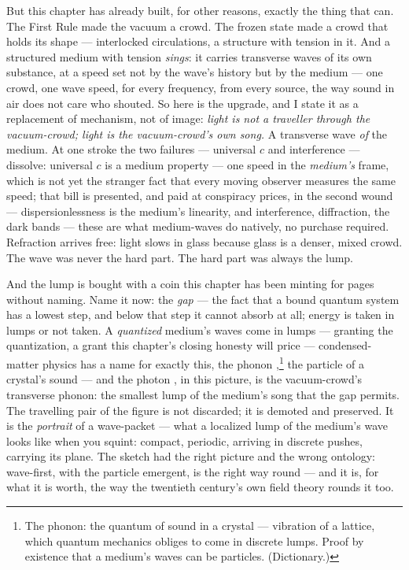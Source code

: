 \documentclass[fontsize=11pt,paper=a4,pagesize=auto,parskip=half-]{scrbook}
\newcommand{\Ixtmp}{}
\DeclareRobustCommand{\Ix}[1]{%
  #1%
  \begingroup
    \lowercase{\gdef\Ixtmp{#1}}%
    \expandafter\index\expandafter{\Ixtmp}%
  \endgroup}
\begin{document}
But this chapter has already built, for other reasons, exactly the thing that can. The First Rule made the vacuum a crowd. The \Ix{frozen state} made a crowd that holds its shape --- interlocked circulations, a structure with tension in it. And a structured medium with tension \emph{sings}: it carries transverse waves of its own substance, at a speed set not by the wave's history but by the medium --- one crowd, one wave speed, for every frequency, from every source, the way sound in air does not care who shouted. So here is the upgrade, and I state it as a replacement of mechanism, not of image: \emph{light is not a traveller through the vacuum-crowd; light is the vacuum-crowd's own song.} A transverse wave \emph{of} the medium. At one stroke the two failures --- universal $c$ and interference --- dissolve: universal $c$ is a medium property --- one speed in the \emph{medium's} frame, which is not yet the stranger fact that every moving observer measures the same speed; that bill is presented, and paid at conspiracy prices, in the second wound --- dispersionlessness is the medium's linearity, and interference, diffraction, the dark bands --- these are what medium-waves do natively, no purchase required. Refraction arrives free: light slows in glass because glass is a denser, mixed crowd. The wave was never the hard part. The hard part was always the lump.

And the lump is bought with a coin this chapter has been minting for pages without naming. Name it now: the \emph{\Ix{gap}} --- the fact that a bound quantum system has a lowest step, and below that step it cannot absorb at all; energy is taken in lumps or not taken. A \emph{quantized} medium's waves come in lumps --- granting the quantization, a grant this chapter's closing honesty will price --- condensed-matter physics has a name for exactly this, the \Ix{phonon},\footnote{The phonon: the quantum of sound in a crystal --- vibration of a lattice, which quantum mechanics obliges to come in discrete lumps. Proof by existence that a medium's waves can be particles. (Dictionary.)} the particle of a crystal's sound --- and the \Ix{photon}, in this picture, is the vacuum-crowd's transverse phonon: the smallest lump of the medium's song that the gap permits. The travelling pair of the figure is not discarded; it is demoted and preserved. It is the \emph{portrait} of a wave-packet --- what a localized lump of the medium's wave looks like when you squint: compact, periodic, arriving in discrete pushes, carrying its plane. The sketch had the right picture and the wrong ontology: wave-first, with the particle emergent, is the right way round --- and it is, for what it is worth, the way the twentieth century's own field theory rounds it too.
\end{document}

